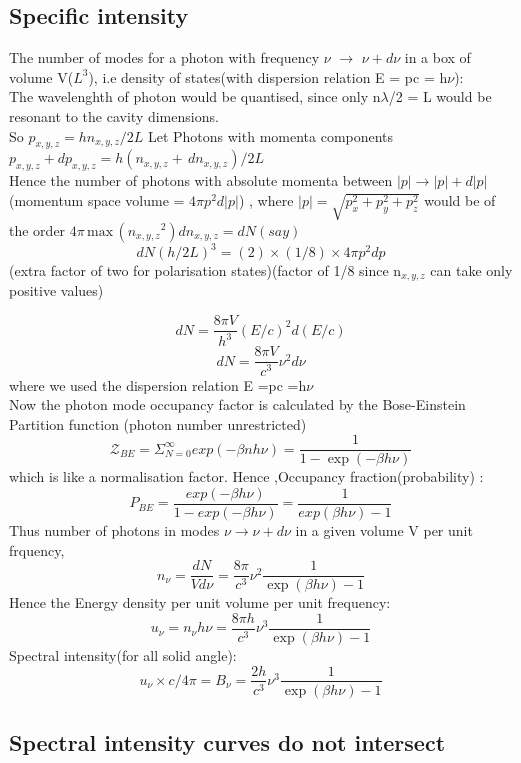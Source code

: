 \documentclass[11pt]{article}
\begin{document}
		\subsection{Specific intensity}
		
		The number of modes for a photon with frequency $\nu$ $\rightarrow$ $\nu + d\nu$ in a box of volume V($L^3$), i.e density of states(with dispersion relation E = pc = h$\nu$):\\
		The wavelenghth of photon would be quantised, since only n$\lambda$/2 = L would be resonant to the cavity dimensions.\\ 
		So \(p_{x,y,z} = hn_{x,y,z}/2L \)
		Let Photons with momenta components \(p_{x,y,z} + dp_{x,y,z} = h (n_{x,y,z} + \, d n_{x,y,z})/2L\)\\
		Hence the number of photons with absolute momenta between $|p|\rightarrow|p|+d|p|$ (momentum space volume = $4\pi p^2 d|p|$) , where $|p| = \sqrt{p_x^2 + p_y^2 + p_z^2}$ would be of the order $4 \pi \, \text{max}\,({n_{x,y,z}}^2) dn_{x,y,z} = dN (say)$ 
		\[
		dN (h/2L)^3 = (2) \times (1/8) \times 4 \pi p^2 dp 
		\](extra factor of two for polarisation states)(factor of 1/8 since n$_{x,y,z}$ can take only positive values)
		
		\[
		dN = \frac{8\pi V}{h^3} (E/c)^2 d(E/c)
		\]
		\[
		dN = \frac{8\pi V}{c^3} \nu^2 d\nu 
		\]
		where we used the dispersion relation E =pc =h$\nu$\\
		Now the photon mode occupancy factor is calculated by the Bose-Einstein Partition function (photon number unrestricted)
		\[
		\mathcal{Z}_{BE} = \Sigma_{N=0}^{\infty} exp(-\beta nh\nu) = \frac{1}{1-\exp(-\beta h \nu)} 
		\]
		which is like a normalisation factor. Hence ,Occupancy fraction(probability) : 
		\[
		P_{BE} = \frac{exp(-\beta h\nu)}{1-exp(-\beta h \nu)} = \frac{1}{exp(\beta h \nu) -1}
		\]
		Thus number of photons in modes $\nu \rightarrow \nu + d\nu$ in a given volume V per unit frquency,
		\[
			n_\nu = \frac{dN}{Vd\nu} = \frac{8\pi}{c^3} \nu^2 \frac{1}{\exp(\beta h \nu)-1}
		\]
		Hence the Energy density per unit volume per unit frequency:
		\[
			u_\nu = n_\nu h\nu = \frac{8\pi h}{c^3} \nu^3 \frac{1}{\exp(\beta h \nu)-1}
		\]
		Spectral intensity(for all solid angle):
		\[
			\boxed{u_\nu \times c/4\pi = B_\nu = \frac{2h}{c^3} \nu^3 \frac{1}{\exp(\beta h \nu)-1}}
		\]
		
		\subsection{Spectral intensity curves do not intersect}
		
\end{document}
